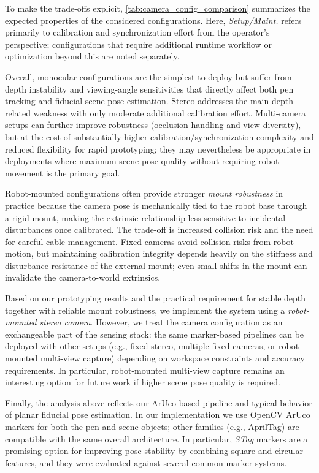 To make the trade-offs explicit, \autoref{tab:camera_config_comparison} summarizes the expected properties of the considered configurations. Here, \emph{Setup/Maint.} refers primarily to calibration and synchronization effort from the operator's perspective; configurations that require additional runtime workflow or optimization beyond this are noted separately.

Overall, monocular configurations are the simplest to deploy but suffer from depth instability and viewing-angle sensitivities that directly affect both pen tracking and fiducial scene pose estimation. Stereo addresses the main depth-related weakness with only moderate additional calibration effort. Multi-camera setups can further improve robustness (occlusion handling and view diversity), but at the cost of substantially higher calibration/synchronization complexity and reduced flexibility for rapid prototyping; they may nevertheless be appropriate in deployments where maximum scene pose quality without requiring robot movement is the primary goal.

Robot-mounted configurations often provide stronger \emph{mount robustness} in practice because the camera pose is mechanically tied to the robot base through a rigid mount, making the extrinsic relationship less sensitive to incidental disturbances once calibrated. The trade-off is increased collision risk and the need for careful cable management. Fixed cameras avoid collision risks from robot motion, but maintaining calibration integrity depends heavily on the stiffness and disturbance-resistance of the external mount; even small shifts in the mount can invalidate the camera-to-world extrinsics.

Based on our prototyping results and the practical requirement for stable depth together with reliable mount robustness, we implement the system using a \emph{robot-mounted stereo camera}. However, we treat the camera configuration as an exchangeable part of the sensing stack: the same marker-based pipelines can be deployed with other setups (e.g., fixed stereo, multiple fixed cameras, or robot-mounted multi-view capture) depending on workspace constraints and accuracy requirements. In particular, robot-mounted multi-view capture remains an interesting option for future work if higher scene pose quality is required.

Finally, the analysis above reflects our ArUco-based pipeline and typical behavior of planar fiducial pose estimation. In our implementation we use OpenCV ArUco markers for both the pen and scene objects; other families (e.g., AprilTag) are compatible with the same overall architecture. In particular, \emph{STag} markers \cite{BENLIGIRAY2019158} are a promising option for improving pose stability by combining square and circular features, and they were evaluated against several common marker systems.


